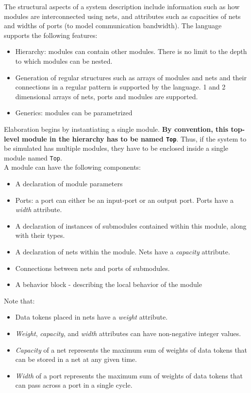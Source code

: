	The structural aspects of a system description include information such as
	how modules are interconnected using nets, and attributes such as 
	capacities of nets and widths of ports (to model communication bandwidth).
	The language supports the following features:
	\begin{itemize}
	\item Hierarchy: modules can contain other modules. There is no limit 
	to the depth to which modules can be nested.
	\item Generation of regular structures such as arrays of modules and nets
	and their connections in a regular pattern is supported by the language.
	1 and 2 dimensional arrays of nets, ports and modules are supported.
	\item Generics: modules can be parametrized
	\end{itemize}

	Elaboration begins by instantiating a single module.  \textbf{By
	convention, this top-level module in the hierarchy has to be named
	\texttt{Top}}.  Thus, if the system to be simulated has multiple
	modules, they have to be enclosed inside a single module named \texttt{Top}.\\

	A module can have the following components:
	\begin{itemize}
	\item A declaration of module parameters
	\item Ports: a port can either be an input-port or an output port.
	Ports have a \emph{width} attribute.
	\item A declaration of instances of submodules contained within this module, along with their types.
	\item A declaration of nets within the module. Nets have a \emph{capacity} attribute.
	\item Connections between nets and ports of submodules.
	\item A behavior block -  describing the local behavior of the module
	\end{itemize}
	
	Note that:
	{\renewcommand{\labelitemi}{$\triangleright$}
	\begin{itemize}
	\item Data tokens placed in nets have a \emph{weight} attribute. 
	\item \emph{Weight}, \emph{capacity}, and \emph{width} attributes can have non-negative integer values.
	\item \emph{Capacity} of a net represents the maximum 
	sum of weights of data tokens that can be stored in a net at any given time.
	\item \emph{Width} of a port represents the maximum sum of weights of data tokens that can pass across
	a port in a single cycle.
	\end{itemize}}
